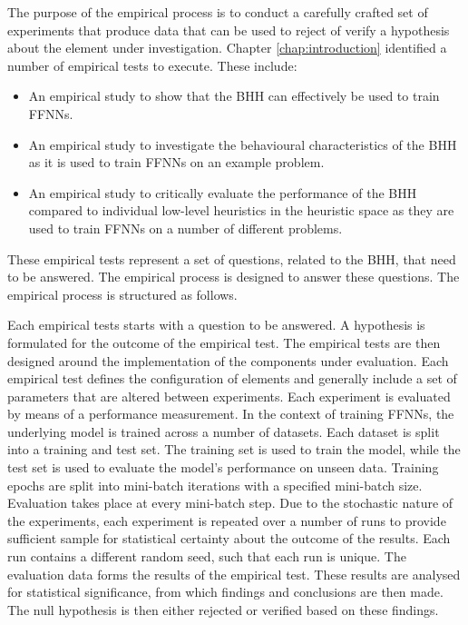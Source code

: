 The purpose of the empirical process is to conduct a carefully crafted set of experiments that produce data that can be used to reject of verify a hypothesis about the element under investigation. Chapter \ref{chap:introduction} identified a number of empirical tests to execute. These include:

\begin{itemize}
      \item An empirical study to show that the \Acs{BHH} can effectively be used to train \acp{FFNN}.

      \item An empirical study to investigate the behavioural characteristics of the \Acs{BHH} as it is used to train \acp{FFNN} on an example problem.

      \item An empirical study to critically evaluate the performance of the \Acs{BHH} compared to individual low-level heuristics in the heuristic space as they are used to train \acp{FFNN} on a number of different problems.
\end{itemize}

\noindent
These empirical tests represent a set of questions, related to the \acs{BHH}, that need to be answered. The empirical process is designed to answer these questions. The empirical process is structured as follows.

Each empirical tests starts with a question to be answered. A hypothesis is formulated for the outcome of the empirical test. The empirical tests are then designed around the implementation of the components under evaluation. Each empirical test defines the configuration of elements and generally include a set of parameters that are altered between experiments. Each experiment is evaluated by means of a performance measurement. In the context of training \acp{FFNN}, the underlying model is trained across a number of datasets. Each dataset is split into a training and test set. The training set is used to train the model, while the test set is used to evaluate the model's performance on unseen data. Training epochs are split into mini-batch iterations with a specified mini-batch size. Evaluation takes place at every mini-batch step. Due to the stochastic nature of the experiments, each experiment is repeated over a number of runs to provide sufficient sample for statistical certainty about the outcome of the results. Each run contains a different random seed, such that each run is unique. The evaluation data forms the results of the empirical test. These results are analysed for statistical significance, from which findings and conclusions are then made. The null hypothesis is then either rejected or verified based on these findings.

